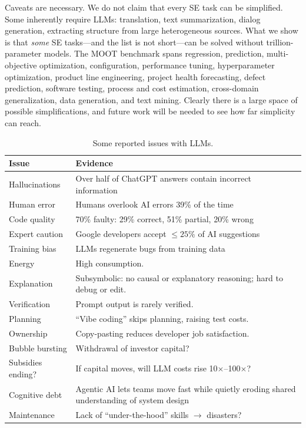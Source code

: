 \documentclass[AMA,STIX2COL]{WileyNJDv5}
\begin{document}
Caveats are necessary. We do not claim that every SE task
can be simplified. Some inherently require LLMs: translation,
text summarization, dialog generation, extracting structure
from large heterogeneous sources. What we show is that
\emph{some} SE tasks---and the list is not short---can be
solved without trillion-parameter models. The MOOT benchmark
spans regression, prediction, multi-objective optimization,
configuration, performance tuning, hyperparameter
optimization, product line engineering, project health
forecasting, defect prediction, software testing, process
and cost estimation, cross-domain generalization, data
generation, and text mining. Clearly there is a large space
of possible simplifications, and future work will be needed
to see how far simplicity can reach.

\begin{table}[!t]
\caption{Some reported issues with LLMs.}\label{cautions}
\begin{tabular}{l|p{5cm}}
\textbf{Issue} & \textbf{Evidence} \\ \hline
Hallucinations
  & Over half of ChatGPT answers contain incorrect
    information~\cite{S12} \\
Human error
  & Humans overlook AI errors 39\% of the time~\cite{S12} \\
Code quality
  & 70\% faulty: 29\% correct, 51\% partial,
    20\% wrong~\cite{S15} \\
Expert caution
  & Google developers accept $\le 25\%$ of AI
    suggestions~\cite{tabachnyk22completion} \\
Training bias
  & LLMs regenerate bugs from training
    data~\cite{S13} \\
Energy         & High consumption. \\
Explanation
  & Subsymbolic: no causal or explanatory
    reasoning; hard to debug or edit. \\
Verification   & Prompt output is rarely verified. \\
Planning
  & ``Vibe coding'' skips planning, raising
    test costs. \\
Ownership
  & Copy-pasting reduces developer
    job satisfaction. \\
Bubble bursting & Withdrawal of investor capital? \\
Subsidies ending?
  & If capital moves, will LLM costs
    rise 10$\times$--100$\times$? \\
Cognitive debt
  & Agentic AI lets teams move fast while quietly
    eroding shared understanding of system
    design~\cite{CognitiveDebt} \\
Maintenance
  & Lack of ``under-the-hood'' skills
    $\rightarrow$ disasters? \\
\end{tabular}
\end{table}
\end{document}
